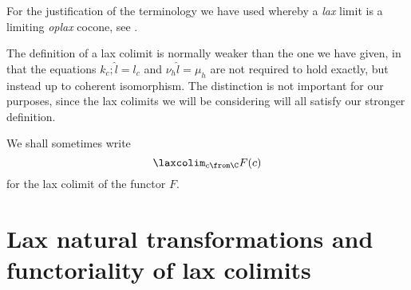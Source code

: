 For the justification of the terminology we have used whereby a \emph{lax} limit is a limiting \emph{oplax} cocone, see \cite{nlab:2-limit}.

\begin{remark}
  The definition of a lax colimit is normally weaker than the one we have given, in that the equations $k_c;\hat l = l_c$ and $\nu_h\hat l = \mu_h$ are not required to hold exactly, but instead up to coherent isomorphism.  
  The distinction is not important for our purposes, since the lax colimits we will be considering will all satisfy our stronger definition.
\end{remark}

We shall sometimes write
\[
  \laxcolim_{c \from \C}F(c)
  \]
for the lax colimit of the functor $F$.

\section{Lax natural transformations and functoriality of lax colimits}

